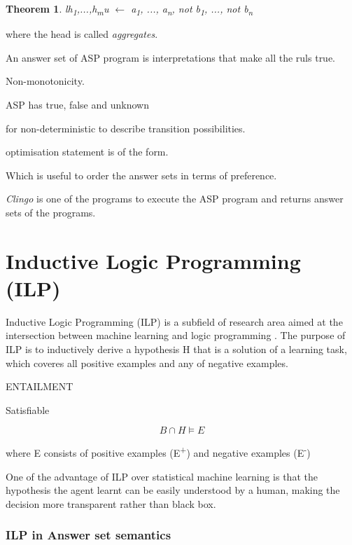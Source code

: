 \documentclass[12pt,twoside]{report}
\newtheorem{theorem}{Theorem}
\begin{document}
\begin{theorem}
l{h\textsubscript{1},...,h\textsubscript{m}}u $\leftarrow$ a\textsubscript{1}, ..., a\textsubscript{n}, not b\textsubscript{1}, ..., not b\textsubscript{n}
\end{theorem}

where the head is called \textit{aggregates}.

An answer set of ASP program is interpretations that make all the ruls true.

Non-monotonicity.

ASP has true, false and unknown

for non-deterministic to describe transition possibilities.

optimisation statement is of the form.

Which is useful to order the answer sets in terms of preference.

\textit{Clingo} is one of the programs to execute the ASP program and returns answer sets of the programs.

\section{Inductive Logic Programming (ILP)}

\label{ilp}
Inductive Logic Programming (ILP) is a subfield of research area aimed at the intersection between machine learning and logic programming \cite{Muggleton1991}. The purpose of ILP is to inductively derive a hypothesis H that is a solution of a learning task, which coveres all positive examples and any of negative examples.

ENTAILMENT

Satisfiable

\begin{equation}
B \cap H \models E
\end{equation}

where E consists of positive examples (E\textsuperscript{+}) and negative examples (E\textsuperscript{-})


One of the advantage of ILP over statistical machine learning is that the hypothesis the agent learnt can be easily understood by a human, making the decision more transparent rather than black box.

\subsubsection{ILP in Answer set semantics}
\end{document}
